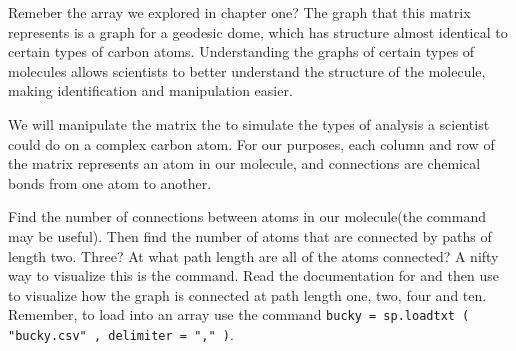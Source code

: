 Remeber the  array we explored in chapter one? The graph that this matrix represents is a graph for a geodesic dome, which has structure almost identical to certain types of carbon atoms. Understanding the graphs of certain types of molecules allows scientists to better understand the structure of the molecule, making identification and manipulation easier.

We will manipulate the matrix the  to simulate the types of analysis a scientist could do on a complex carbon atom. For our purposes, each column and row of the  matrix represents an atom in our molecule, and connections are chemical bonds from one atom to another.

\begin{problem}
Find the number of connections between atoms in our molecule(the command  may be useful). Then find the number of atoms that are connected by paths of length two. Three? At what path length are all of the atoms connected?
A nifty way to visualize this is the  command. Read the documentation for  and then use  to visualize how the graph is connected at path length one, two, four and ten. Remember, to load  into an array use the command \lstinline{bucky = sp.loadtxt ( "bucky.csv" , delimiter = "," )}.
\end{problem}
